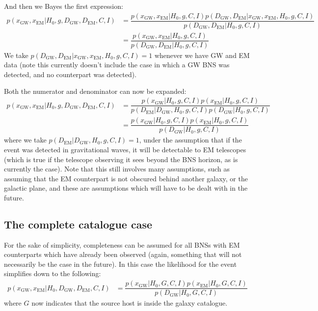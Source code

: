 \documentclass[a4paper,10pt]{article}
\begin{document}
And then we Bayes the first expression:
\begin{equation}
\begin{aligned}
p(x_{\text{GW}},x_{\text{EM}}|H_0,g,D_{\text{GW}},D_{\text{EM}},C,I) &= \dfrac{p(x_{\text{GW}},x_{\text{EM}}|H_0,g,C,I) p(D_{\text{GW}},D_{\text{EM}}|x_{\text{GW}},x_{\text{EM}},H_0,g,C,I)}{p(D_{\text{GW}},D_{\text{EM}}|H_0,g,C,I)}
\\&= \dfrac{p(x_{\text{GW}},x_{\text{EM}}|H_0,g,C,I)}{p(D_{\text{GW}},D_{\text{EM}}|H_0,g,C,I)} 
\end{aligned} 
\end{equation}
We take $p(D_{\text{GW}},D_{\text{EM}}|x_{\text{GW}},x_{\text{EM}},H_0,g,C,I)=1$ whenever we have GW and EM data (note this currently doesn't include the case in which a GW BNS was detected, and no counterpart was detected).

Both the numerator and denominator can now be expanded:
\begin{equation}
\begin{aligned}
p(x_{\text{GW}},x_{\text{EM}}|H_0,g,D_{\text{GW}},D_{\text{EM}},C,I) &= \dfrac{p(x_{\text{GW}}|H_0,g,C,I) p(x_{\text{EM}}|H_0,g,C,I)}{p(D_{\text{EM}}|D_{\text{GW}},H_0,g,C,I) p(D_{\text{GW}}|H_0,g,C,I)} 
\\ &= \dfrac{p(x_{\text{GW}}|H_0,g,C,I) p(x_{\text{EM}}|H_0,g,C,I)}{p(D_{\text{GW}}|H_0,g,C,I)} 
\end{aligned} 
\end{equation}
where we take $p(D_{\text{EM}}|D_{\text{GW}},H_0,g,C,I) = 1$, under the assumption that if the event was detected in gravitational waves, it will be detectable to EM telescopes (which is true if the telescope observing it sees beyond the BNS horizon, as is currently the case).  Note that this still involves many assumptions, such as assuming that the EM counterpart is not obscured behind another galaxy, or the galactic plane, and these are assumptions which will have to be dealt with in the future.


\subsection{The complete catalogue case}
For the sake of simplicity, completeness can be assumed for all BNSs with EM counterparts which have already been observed (again, something that will not necessarily be the case in the future).  In this case the likelihood for the event simplifies down to the following:
\begin{equation}
\begin{aligned}
p(x_{\text{GW}},x_{\text{EM}}|H_0,D_{\text{GW}},D_{\text{EM}},C,I) &= \dfrac{p(x_{\text{GW}}|H_0,G,C,I) p(x_{\text{EM}}|H_0,G,C,I)}{p(D_{\text{GW}}|H_0,G,C,I)} 
\end{aligned} 
\end{equation}
where $G$ now indicates that the source host is inside the galaxy catalogue.
\end{document}
